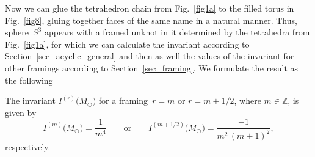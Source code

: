 \documentclass[pdftex]{sigma}
\begin{document}
Now we can glue the tetrahedron chain from Fig.~\ref{fig1a} to the f\/illed torus in Fig.~\ref{fig8}, gluing together faces of the same name in a natural manner. Thus, sphere~$S^3$ appears with a framed unknot in it determined by the tetrahedra from Fig.~\ref{fig1a}, for which we can calculate the invariant according to Section~\ref{sec_acyclic_general} and then as well the values of the invariant for other framings according to Section~\ref{sec_framing}. We formulate the result as the following
\begin{theorem}
\label{th_Iunknot}
The invariant $I^{(r)}\bigl(M_\bigcirc\bigr)$ for a framing~$r=m$ or $r=m+1/2$, where $m\in \mathbb Z$, is given by{\samepage
\begin{equation*}
I^{(m)}\bigl(M_\bigcirc\bigr) = \frac{1}{m^4}
\qquad \mbox{or}
\qquad
I^{(m + 1/2)}\bigl(M_\bigcirc\bigr) = \frac{- 1}{m^2 \, (m+1)^2},
\end{equation*}
respectively.}
\end{theorem}
\end{document}
